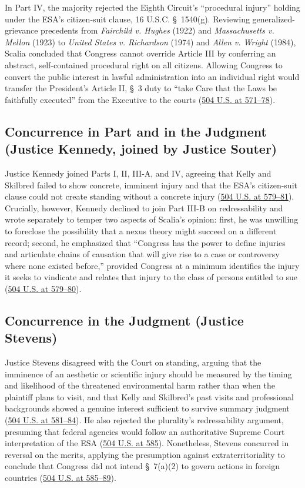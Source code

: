 \documentclass[12pt]{article}
\begin{document}
In Part IV, the majority rejected the Eighth Circuit's ``procedural injury'' holding under the ESA's citizen-suit clause, 16 U.S.C. \S~1540(g). Reviewing generalized-grievance precedents from \textit{Fairchild v. Hughes} (1922) and \textit{Massachusetts v. Mellon} (1923) to \textit{United States v. Richardson} (1974) and \textit{Allen v. Wright} (1984), Scalia concluded that Congress cannot override Article III by conferring an abstract, self-contained procedural right on all citizens. Allowing Congress to convert the public interest in lawful administration into an individual right would transfer the President's Article II, \S~3 duty to ``take Care that the Laws be faithfully executed'' from the Executive to the courts (\href{https://supreme.justia.com/cases/federal/us/504/555/}{504 U.S. at 571--78}).

\subsection{Concurrence in Part and in the Judgment (Justice Kennedy, joined by Justice Souter)}
Justice Kennedy joined Parts I, II, III-A, and IV, agreeing that Kelly and Skilbred failed to show concrete, imminent injury and that the ESA's citizen-suit clause could not create standing without a concrete injury (\href{https://supreme.justia.com/cases/federal/us/504/555/}{504 U.S. at 579--81}). Crucially, however, Kennedy declined to join Part III-B on redressability and wrote separately to temper two aspects of Scalia's opinion: first, he was unwilling to foreclose the possibility that a nexus theory might succeed on a different record; second, he emphasized that ``Congress has the power to define injuries and articulate chains of causation that will give rise to a case or controversy where none existed before,'' provided Congress at a minimum identifies the injury it seeks to vindicate and relates that injury to the class of persons entitled to sue (\href{https://supreme.justia.com/cases/federal/us/504/555/}{504 U.S. at 579--80}).

\subsection{Concurrence in the Judgment (Justice Stevens)}
Justice Stevens disagreed with the Court on standing, arguing that the imminence of an aesthetic or scientific injury should be measured by the timing and likelihood of the threatened environmental harm rather than when the plaintiff plans to visit, and that Kelly and Skilbred's past visits and professional backgrounds showed a genuine interest sufficient to survive summary judgment (\href{https://supreme.justia.com/cases/federal/us/504/555/}{504 U.S. at 581--84}). He also rejected the plurality's redressability argument, presuming that federal agencies would follow an authoritative Supreme Court interpretation of the ESA (\href{https://supreme.justia.com/cases/federal/us/504/555/}{504 U.S. at 585}). Nonetheless, Stevens concurred in reversal on the merits, applying the presumption against extraterritoriality to conclude that Congress did not intend \S~7(a)(2) to govern actions in foreign countries (\href{https://supreme.justia.com/cases/federal/us/504/555/}{504 U.S. at 585--89}).
\end{document}
